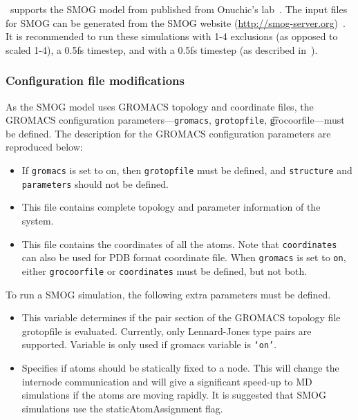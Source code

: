 \NAMD\ supports the SMOG model from published from Onuchic's lab~\cite{Whitford2009aaa,Whitford2009nhf}.
The input files for SMOG can be generated from the SMOG website (\url{http://smog-server.org})~\cite{Noel2010ssd}.
It is recommended to run these simulations with 1-4 exclusions (as opposed to scaled 1-4), a 0.5fs timestep,
and with a 0.5fs timestep (as described in~\cite{Whitford2009aaa,Whitford2009nhf}).  

\subsubsection{Configuration file modifications} 

As the SMOG model uses GROMACS topology and coordinate files, the GROMACS
 configuration parameters---{\tt gromacs}, {\tt grotopfile}, {\t grocoorfile}---must be defined.
The description for the GROMACS configuration parameters are reproduced below:

\begin{itemize}
\item
{}
{
If {\tt gromacs} is set to on, then {\tt grotopfile} must be defined,
and {\tt structure} and {\tt parameters} should not be defined.
}
\item
{}
{
This file contains complete topology and parameter information of
the system.
}

\item
{}
{
This file contains the coordinates of all the atoms. Note that
{\tt coordinates} can also be used for PDB format coordinate
file. When {\tt gromacs} is set to {\tt on}, either {\tt grocoorfile}
or {\tt coordinates} must be defined, but not both.
}
\end{itemize}

To run a SMOG simulation, the following extra parameters must be defined.

\begin{itemize}
\item
{}
{
This variable determines if the pair section of the GROMACS topology file {grotopfile} is evaluated.
 Currently, only Lennard-Jones type pairs are supported.
Variable is only used if gromacs variable is {\tt `on'}.
}

\item
{}
{
Specifies if atoms should be statically fixed to a node.  This will change the internode communication and will give a significant
speed-up to MD simulations if the atoms are moving rapidly.  It is suggested that SMOG simulations use the staticAtomAssignment flag.
}
\end{itemize}

